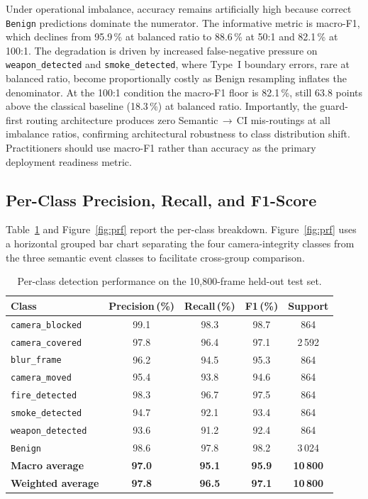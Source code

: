 \documentclass[a4paper,fleqn]{cas-dc}
\begin{document}
Under operational imbalance, accuracy remains artificially high because correct \texttt{Benign} predictions dominate the numerator. The informative metric is macro-F1, which declines from 95.9\,\% at balanced ratio to 88.6\,\% at 50:1 and 82.1\,\% at 100:1. The degradation is driven by increased false-negative pressure on \texttt{weapon\_detected} and \texttt{smoke\_detected}, where Type~I boundary errors, rare at balanced ratio, become proportionally costly as Benign resampling inflates the denominator. At the 100:1 condition the macro-F1 floor is 82.1\,\%, still 63.8 points above the classical baseline (18.3\,\%) at balanced ratio. Importantly, the guard-first routing architecture produces zero Semantic$\,\to$\,CI mis-routings at all imbalance ratios, confirming architectural robustness to class distribution shift. Practitioners should use macro-F1 rather than accuracy as the primary deployment readiness metric.
 
 
 
\FloatBarrier
\subsection{Per-Class Precision, Recall, and F1-Score}
\label{sec:perclass}
 
Table~\ref{tab:per-class} and Figure~\ref{fig:prf} report the per-class
breakdown. Figure~\ref{fig:prf} uses a horizontal grouped bar chart
separating the four camera-integrity classes from the three semantic event
classes to facilitate cross-group comparison.
 
\begin{table}[!ht]
\caption{Per-class detection performance on the 10{,}800-frame held-out test set.}
\label{tab:per-class}
\centering\small\setlength{\tabcolsep}{4pt}
\begin{tabularx}{\linewidth}{@{}>{\raggedright\arraybackslash}Xcccc@{}}
\toprule
\textbf{Class} & \textbf{Precision\,(\%)} & \textbf{Recall\,(\%)} &
\textbf{F1\,(\%)} & \textbf{Support} \\
\midrule
\texttt{camera\_blocked}  & 99.1 & 98.3 & 98.7 & 864 \\
\texttt{camera\_covered}  & 97.8 & 96.4 & 97.1 & 2\,592 \\
\texttt{blur\_frame}      & 96.2 & 94.5 & 95.3 & 864 \\
\texttt{camera\_moved}    & 95.4 & 93.8 & 94.6 & 864 \\
\texttt{fire\_detected}   & 98.3 & 96.7 & 97.5 & 864 \\
\texttt{smoke\_detected}  & 94.7 & 92.1 & 93.4 & 864 \\
\texttt{weapon\_detected} & 93.6 & 91.2 & 92.4 & 864 \\
\texttt{Benign}           & 98.6 & 97.8 & 98.2 & 3\,024 \\
\midrule
\textbf{Macro average}    & \textbf{97.0} & \textbf{95.1} &
\textbf{95.9} & \textbf{10\,800} \\
\textbf{Weighted average} & \textbf{97.8} & \textbf{96.5} &
\textbf{97.1} & \textbf{10\,800} \\
\bottomrule
\end{tabularx}
\end{table}
 
\end{document}
